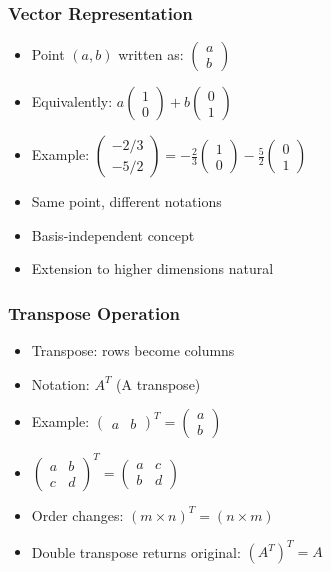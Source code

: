 \begin{frame}[fragile]\frametitle{Vector Representation}
  \begin{itemize}
    \item Point $(a, b)$ written as: $\begin{pmatrix} a \\ b \end{pmatrix}$
    \item Equivalently: $a\begin{pmatrix} 1 \\ 0 \end{pmatrix} + b\begin{pmatrix} 0 \\ 1 \end{pmatrix}$
    \item Example: $\begin{pmatrix} -2/3 \\ -5/2 \end{pmatrix} = -\frac{2}{3}\begin{pmatrix} 1 \\ 0 \end{pmatrix} - \frac{5}{2}\begin{pmatrix} 0 \\ 1 \end{pmatrix}$
    \item Same point, different notations
    \item Basis-independent concept
    \item Extension to higher dimensions natural
  \end{itemize}
\end{frame}

\begin{frame}[fragile]\frametitle{Transpose Operation}
  \begin{itemize}
    \item Transpose: rows become columns
    \item Notation: $A^T$ (A transpose)
    \item Example: $\begin{pmatrix} a & b \end{pmatrix}^T = \begin{pmatrix} a \\ b \end{pmatrix}$
    \item $\begin{pmatrix} a & b \\ c & d \end{pmatrix}^T = \begin{pmatrix} a & c \\ b & d \end{pmatrix}$
    \item Order changes: $(m \times n)^T = (n \times m)$
    \item Double transpose returns original: $(A^T)^T = A$
  \end{itemize}
\end{frame}

